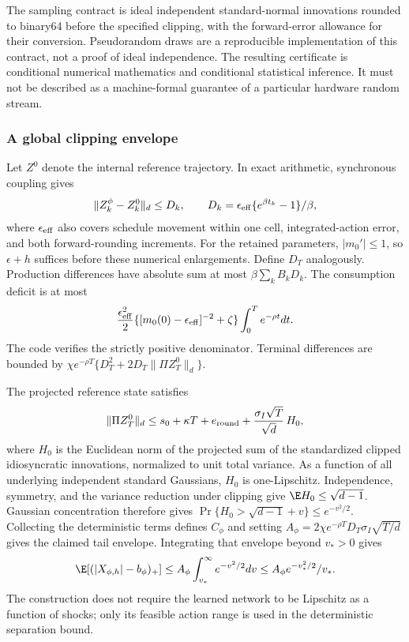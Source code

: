 The sampling contract is ideal independent standard-normal innovations rounded to binary64 before the specified clipping, with the forward-error allowance for their conversion. Pseudorandom draws are a reproducible implementation of this contract, not a proof of ideal independence. The resulting certificate is conditional numerical mathematics and conditional statistical inference. It must not be described as a machine-formal guarantee of a particular hardware random stream.

\subsubsection{A global clipping envelope}
Let $Z^0$ denote the internal reference trajectory. In exact arithmetic, synchronous coupling gives
\[
 \|Z_k^\phi-Z_k^0\|_d\leq D_k,
 \qquad D_k=\epsilon_{\rm eff}\{e^{\beta t_k}-1\}/\beta,
\]
where $\epsilon_{\rm eff}$ also covers schedule movement within one cell, integrated-action error, and both forward-rounding increments. For the retained parameters, $|m_0'|\leq1$, so $\epsilon+h$ suffices before these numerical enlargements. Define $D_T$ analogously. Production differences have absolute sum at most $\beta\sum_k B_kD_k$. The consumption deficit is at most
\[
 \frac{\epsilon_{\rm eff}^2}{2}
  \{[m_0(0)-\epsilon_{\rm eff}]^{-2}+\zeta\}
                 \int_0^T e^{-\rho t}dt.
\]
The code verifies the strictly positive denominator. Terminal differences are bounded by
$\chi e^{-\rho T}\{D_T^2+2D_T\|\Pi Z_T^0\|_d\}$.

The projected reference state satisfies
\[
 \|\Pi Z_T^0\|_d\leq s_0+\kappa T+e_{\rm round}
  +\frac{\sigma_I\sqrt T}{\sqrt d}\,H_0,
\]
where $H_0$ is the Euclidean norm of the projected sum of the standardized clipped idiosyncratic innovations, normalized to unit total variance. As a function of all underlying independent standard Gaussians, $H_0$ is one-Lipschitz. Independence, symmetry, and the variance reduction under clipping give $\E H_0\leq\sqrt{d-1}$. Gaussian concentration therefore gives
$\Pr\{H_0>\sqrt{d-1}+v\}\leq e^{-v^2/2}$.
Collecting the deterministic terms defines $C_\phi$ and setting
$A_\phi=2\chi e^{-\rho T}D_T\sigma_I\sqrt{T/d}$ gives the claimed tail envelope. Integrating that envelope beyond $v_*>0$ gives
\[
 \E[(|X_{\phi,h}|-b_\phi)_+]
 \leq A_\phi\int_{v_*}^{\infty}e^{-v^2/2}dv
 \leq A_\phi e^{-v_*^2/2}/v_*.
\]
The construction does not require the learned network to be Lipschitz as a function of shocks; only its feasible action range is used in the deterministic separation bound.

